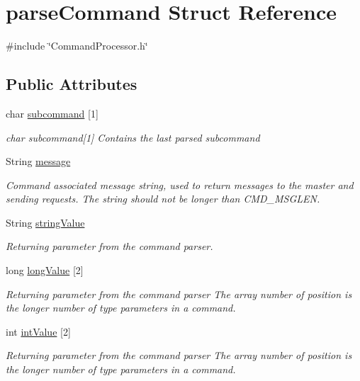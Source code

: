 \hypertarget{structparse_command}{\section{parse\-Command Struct Reference}
\label{structparse_command}
}


{\ttfamily \#include \char`\"{}Command\-Processor.\-h\char`\"{}}

\subsection*{Public Attributes}
\begin{DoxyCompactItemize}
\item 
char \hyperlink{structparse_command_a10312bf6b72a9315a4fb550458bc3ae9}{subcommand} \mbox{[}1\mbox{]}
\begin{DoxyCompactList}\small\item\em char subcommand\mbox{[}1\mbox{]} Contains the last parsed subcommand \end{DoxyCompactList}\item 
String \hyperlink{structparse_command_a5d2f84606922f34ad6a8ca5f7d8a59b5}{message}
\begin{DoxyCompactList}\small\item\em Command associated message string, used to return messages to the master and sending requests. The string should not be longer than C\-M\-D\-\_\-\-M\-S\-G\-L\-E\-N. \end{DoxyCompactList}\item 
String \hyperlink{structparse_command_ac5ece0b161e3fae794d08911247c0b1e}{string\-Value}
\begin{DoxyCompactList}\small\item\em Returning parameter from the command parser. \end{DoxyCompactList}\item 
long \hyperlink{structparse_command_a10deac33dc255dd8a8b84532bbeb6c42}{long\-Value} \mbox{[}2\mbox{]}
\begin{DoxyCompactList}\small\item\em Returning parameter from the command parser The array number of position is the longer number of type parameters in a command. \end{DoxyCompactList}\item 
int \hyperlink{structparse_command_a9ad775810b79683631510fd333096c6f}{int\-Value} \mbox{[}2\mbox{]}
\begin{DoxyCompactList}\small\item\em Returning parameter from the command parser The array number of position is the longer number of type parameters in a command. \end{DoxyCompactList}\item 

\end{DoxyCompactItemize}
